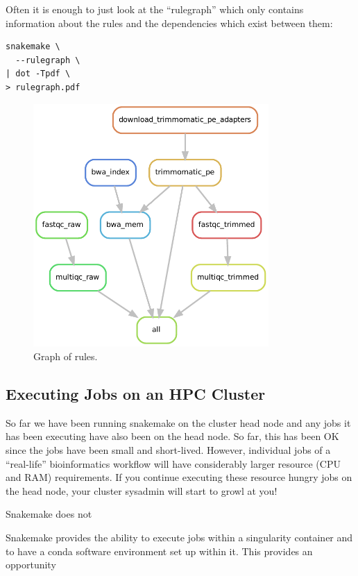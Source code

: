 Often it is enough to just look at the ``rulegraph'' which only contains information about the rules and the dependencies which exist between them:

\begin{lstlisting}
snakemake \
  --rulegraph \
| dot -Tpdf \
> rulegraph.pdf
\end{lstlisting}

\begin{figure}[H]
\centering
\includegraphics[width=0.8\textwidth]{handout/rulegraph.pdf}
\caption{Graph of rules.}
\label{fig:rulegraph}
\end{figure}

\subsection{Executing Jobs on an HPC Cluster}

So far we have been running snakemake on the cluster head node and any jobs it has been executing have also been on the head node. So far, this has been OK
since the jobs have been small and short-lived. However, individual jobs of a ``real-life'' bioinformatics workflow will have considerably larger resource
(CPU and RAM) requirements. If you continue executing these resource hungry jobs on the head node, your cluster sysadmin will start to growl at you!

Snakemake does not

Snakemake provides the ability to execute jobs within a singularity container and to have a conda software environment set up within it. This provides an opportunity

